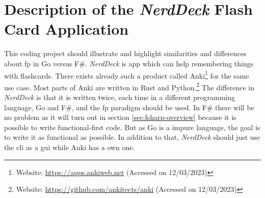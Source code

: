     \section{Description of the \textit{NerdDeck} Flash Card Application}\label{sec:description}
    This coding project should illustrate and highlight similarities and differences about \ac{fp} in Go versus F\#.
    \textit{NerdDeck} is app which can help remembering things with flashcards. There exists already such a product called Anki\footnote{Website: \url{https://apps.ankiweb.net} (Accessed on 12/03/2023)} for the same use case. Most parts of Anki are written in Rust and Python.\footnote{Website: \url{https://github.com/ankitects/anki} (Accessed on 12/03/2023)} The difference in \textit{NerdDeck} is that it is written twice, each time in a different programming language, Go and F\#, and the \ac{fp} paradigm should be used. In F\# there will be no problem as it will turn out in section \ref{sec:fsharp-overview} because it is possible to write functional-first code. But as Go is a impure language, the goal is to write it as functional as possible. In addition to that, \textit{NerdDeck} should just use the \ac{cli} as a \ac{gui} while Anki has a own one.

